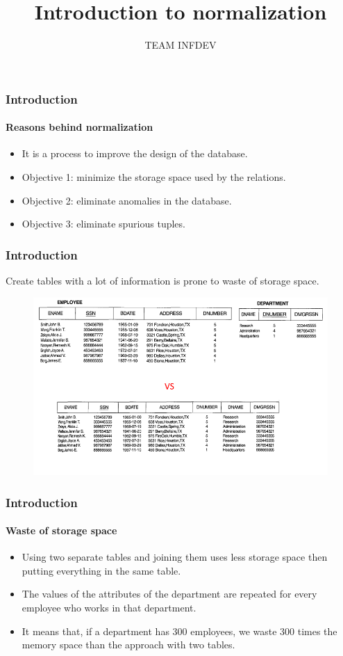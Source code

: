 \documentclass{beamer}
\title{Introduction to normalization}
\author{TEAM INFDEV}
\institute{Hogeschool Rotterdam \\ 
	Rotterdam, Netherlands}
\date{}
\begin{document}
\maketitle


\begin{frame}
	\frametitle{Introduction}
	\framesubtitle{Reasons behind normalization}
	\begin{itemize}
		\item It is a process to improve the design of the database.
		\item Objective 1: minimize the storage space used by the relations.
		\item Objective 2: eliminate anomalies in the database.
		\item Objective 3: eliminate spurious tuples.
	\end{itemize}
\end{frame}

\begin{frame}
	\frametitle{Introduction}
	Create tables with a lot of information is prone to waste of storage space.

	\begin{figure}
		\includegraphics[scale=0.4]{img/normalization/norm1}
	\end{figure}
\end{frame}

\begin{frame}
	\frametitle{Introduction}
	\framesubtitle{Waste of storage space}
	\begin{itemize}
		\item Using two separate tables and joining them uses less storage space then putting everything in the same table.
		\item The values of the attributes of the department are repeated for every employee who works in that department.
		\item It means that, if a department has 300 employees, we waste 300 times the memory space than the approach with two tables.
	\end{itemize}
\end{frame}
\end{document}
